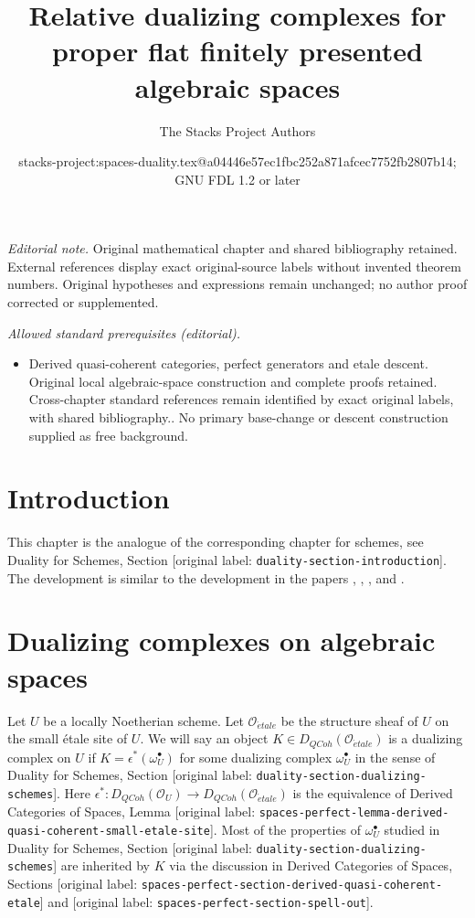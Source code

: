 \documentclass[10pt,a4paper]{article}
\title{Relative dualizing complexes for proper flat finitely presented algebraic spaces}
\author{The Stacks Project Authors}
\date{stacks-project:spaces-duality.tex@a04446e57ec1fbc252a871afcec7752fb2807b14; GNU FDL 1.2 or later}
\theoremstyle{plain}
\theoremstyle{definition}
\theoremstyle{remark}
\numberwithin{equation}{subsection}
\def\etale{{\acute{e}tale}}
\def\QCoh{\mathit{QCoh}}
\begin{document}
\maketitle
\noindent\textit{Editorial note.} Original mathematical chapter and shared bibliography retained. External references display exact original-source labels without invented theorem numbers. Original hypotheses and expressions remain unchanged; no author proof corrected or supplemented.\par\medskip
\noindent\textit{Allowed standard prerequisites (editorial).}\begin{itemize}
\item Derived quasi-coherent categories, perfect generators and etale descent. Original local algebraic-space construction and complete proofs retained. Cross-chapter standard references remain identified by exact original labels, with shared bibliography.. No primary base-change or descent construction supplied as free background.
\end{itemize}\medskip
\section{Introduction}
\label{section-introduction}

\noindent
This chapter is the analogue of the corresponding chapter for
schemes, see Duality for Schemes, Section \textnormal{[original label: \nolinkurl{duality-section-introduction}]}.
The development is similar to the development in the papers
\cite{Neeman-Grothendieck}, \cite{LN},
\cite{Lipman-notes}, and \cite{Neeman-improvement}.




\section{Dualizing complexes on algebraic spaces}
\label{section-dualizing-spaces}

\noindent
Let $U$ be a locally Noetherian scheme. Let $\mathcal{O}_\etale$
be the structure sheaf of $U$ on the small \'etale site of $U$.
We will say an object $K \in D_\QCoh(\mathcal{O}_\etale)$ is
a dualizing complex on $U$ if $K = \epsilon^*(\omega_U^\bullet)$
for some dualizing complex $\omega_U^\bullet$ in the sense of
Duality for Schemes, Section \textnormal{[original label: \nolinkurl{duality-section-dualizing-schemes}]}.
Here $\epsilon^* : D_\QCoh(\mathcal{O}_U) \to D_\QCoh(\mathcal{O}_\etale)$
is the equivalence of Derived Categories of Spaces, Lemma
\textnormal{[original label: \nolinkurl{spaces-perfect-lemma-derived-quasi-coherent-small-etale-site}]}.
Most of the properties of $\omega_U^\bullet$ studied in
Duality for Schemes, Section \textnormal{[original label: \nolinkurl{duality-section-dualizing-schemes}]}
are inherited by $K$ via the discussion in
Derived Categories of Spaces, Sections
\textnormal{[original label: \nolinkurl{spaces-perfect-section-derived-quasi-coherent-etale}]} and
\textnormal{[original label: \nolinkurl{spaces-perfect-section-spell-out}]}.
\end{document}
